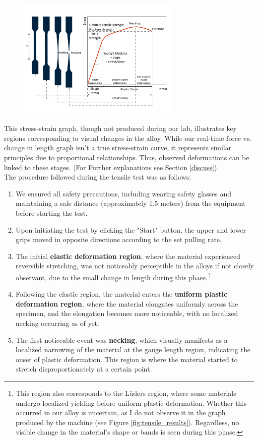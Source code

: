 \documentclass{article}
\begin{document}
\begin{figure}[H]
    \centering    
    \includegraphics[width=0.7\textwidth]{images/simwiki-stress-strain-shape-evolution.png}
    \label{fig:alloys_next_graph}
\end{figure}
This stress-strain graph, though not produced during our lab, illustrates key regions corresponding to visual changes in the alloy. While our real-time force vs. change in length graph isn't a true stress-strain curve, it represents similar principles due to proportional relationships. Thus, observed deformations can be linked to these stages. (For Further explanations see Section \ref{discuss}).\\[8pt]
The procedure followed during the tensile test was as follows: 
\begin{enumerate}
    \item We ensured all safety precautions, including wearing safety glasses and maintaining a safe distance (approximately 1.5 meters) from the equipment before starting the test.
    \item Upon initiating the test by clicking the "Start" button, the upper and lower grips moved in opposite directions according to the set pulling rate.
    \item The initial \textbf{elastic deformation region}, where the material experienced reversible stretching, was not noticeably perceptible in the alloys if not closely observant, due to the small change in length during this phase.\footnote{This region also corresponds to the Lüders region, where some materials undergo localized yielding before uniform plastic deformation. Whether this occurred in our alloy is uncertain, as I do not observe it in the graph produced by the machine (see Figure \ref{fig:tensile_results}). Regardless, no visible change in the material's shape or bands is seen during this phase.}
    \item Following the elastic region, the material enters the \textbf{uniform plastic deformation region}, where the material elongates uniformly across the specimen, and the elongation becomes more noticeable, with no localized necking occurring as of yet.
    \item The first noticeable event was \textbf{necking}, which visually manifests as a localized narrowing of the material at the gauge length region, indicating the onset of plastic deformation. This region is where the material started to stretch disproportionately at a certain point.
\end{enumerate}
\end{document}

